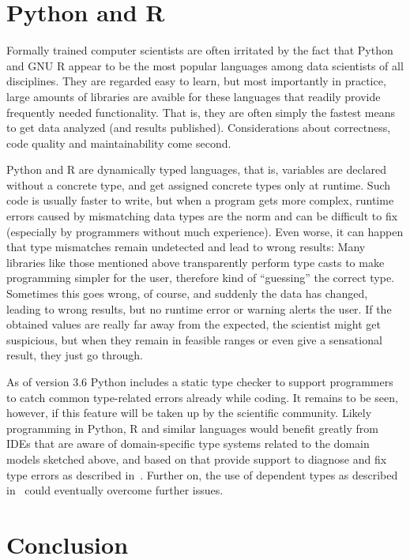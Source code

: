 \documentclass[sigplan,10pt,noacm]{acmart}
\begin{document}
\section{Python and R}

Formally trained computer scientists are often irritated by the fact that Python and GNU R appear to be the most popular languages among data scientists of all disciplines. They are regarded easy to learn, but most importantly in practice, large amounts of libraries are avaible for these languages that readily provide frequently needed functionality. That is, they are often simply the fastest means to get data analyzed (and results published). Considerations about correctness, code quality and maintainability come second.

Python and R are dynamically typed languages, that is, variables are declared without a concrete type, and get assigned concrete types only at runtime. Such code is usually faster to write, but when a program gets more complex, runtime errors caused by mismatching data types are the norm and can be difficult to fix (especially by programmers without much experience).
Even worse, it can happen that type mismatches remain undetected and lead to wrong results: Many libraries like those mentioned above transparently perform type casts to make programming simpler for the user, therefore kind of \enquote{guessing} the correct type. Sometimes this goes wrong, of course, and suddenly the data has changed, leading to wrong results, but no runtime error or warning alerts the user. If the obtained values are really far away from the expected, the scientist might get suspicious, but when they remain in feasible ranges or even give a sensational result, they just go through.

As of version 3.6 Python includes a static type checker to support programmers to catch common type-related errors already while coding. It remains to be seen, however, if this feature will be taken up by the scientific community. Likely programming in Python, R and similar languages would benefit greatly from IDEs that are aware of domain-specific type systems related to the domain models sketched above, and based on that provide support to diagnose and fix type errors as described in~\cite{jur}. Further on, the use of dependent types as described in~\cite{wouter} could eventually overcome further issues.


\section{Conclusion}
\end{document}
